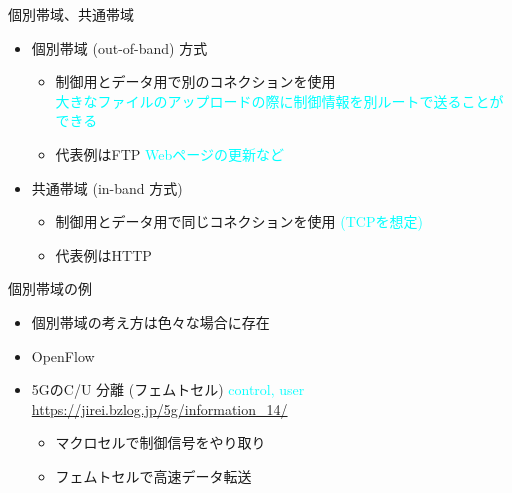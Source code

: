 個別帯域、共通帯域
\begin{itemize}
  \item 個別帯域 (out-of-band) 方式
  \begin{itemize}
    \item 制御用とデータ用で別のコネクションを使用\\
    \textcolor{cyan}{大きなファイルのアップロードの際に制御情報を別ルートで送ることができる}
    \item 代表例はFTP \textcolor{cyan}{Webページの更新など}
  \end{itemize}
  \item 共通帯域 (in-band 方式)
  \begin{itemize}
    \item 制御用とデータ用で同じコネクションを使用
      \textcolor{cyan}{(TCPを想定)}
    \item 代表例はHTTP
  \end{itemize}
\end{itemize}

個別帯域の例
\begin{itemize}
  \item 個別帯域の考え方は色々な場合に存在
  \item OpenFlow
  \item 5GのC/U 分離 (フェムトセル) \textcolor{cyan}{control, user \url{https://jirei.bzlog.jp/5g/information_14/}}
  \begin{itemize}
    \item マクロセルで制御信号をやり取り
    \item フェムトセルで高速データ転送
  \end{itemize}
\end{itemize}
